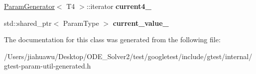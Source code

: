 \begin{DoxyCompactItemize}
\item 
\mbox{\label{classtesting_1_1internal_1_1_cartesian_product_generator4_1_1_iterator_a8c484c5e018ef121f0f49585e40983ed}} 
\mbox{\hyperlink{classtesting_1_1internal_1_1_param_generator}{Param\+Generator}}$<$ T4 $>$\+::iterator {\bfseries current4\+\_\+}
\item 
\mbox{\label{classtesting_1_1internal_1_1_cartesian_product_generator4_1_1_iterator_a8819c1279938f000d763feb7d10eb67e}} 
std\+::shared\+\_\+ptr$<$ Param\+Type $>$ {\bfseries current\+\_\+value\+\_\+}
\end{DoxyCompactItemize}


The documentation for this class was generated from the following file\+:\begin{DoxyCompactItemize}
\item 
/\+Users/jiahuawu/\+Desktop/\+O\+D\+E\+\_\+\+Solver2/test/googletest/include/gtest/internal/gtest-\/param-\/util-\/generated.\+h\end{DoxyCompactItemize}
